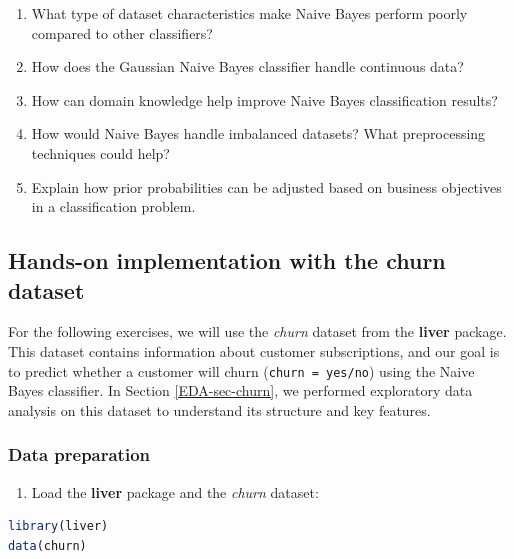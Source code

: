 \documentclass[
]{book}
\newcommand{\passthrough}[1]{#1}
\providecommand{\tightlist}{%
  \setlength{\itemsep}{0pt}\setlength{\parskip}{0pt}}
\theoremstyle{definition}
\theoremstyle{definition}
\theoremstyle{definition}
\theoremstyle{definition}
\theoremstyle{remark}
\begin{document}
\begin{enumerate}
\item
  What type of dataset characteristics make Naive Bayes perform poorly compared to other classifiers?\\
\item
  How does the Gaussian Naive Bayes classifier handle continuous data?\\
\item
  How can domain knowledge help improve Naive Bayes classification results?\\
\item
  How would Naive Bayes handle imbalanced datasets? What preprocessing techniques could help?\\
\item
  Explain how prior probabilities can be adjusted based on business objectives in a classification problem.
\end{enumerate}

\subsection*{Hands-on implementation with the churn dataset}\label{hands-on-implementation-with-the-churn-dataset}

For the following exercises, we will use the \emph{churn} dataset from the \textbf{liver} package. This dataset contains information about customer subscriptions, and our goal is to predict whether a customer will churn (\passthrough{\lstinline!churn = yes/no!}) using the Naive Bayes classifier. In Section \ref{EDA-sec-churn}, we performed exploratory data analysis on this dataset to understand its structure and key features.

\subsubsection*{Data preparation}\label{data-preparation-2}

\begin{enumerate}
\def\labelenumi{\arabic{enumi}.}
\setcounter{enumi}{16}
\tightlist
\item
  Load the \textbf{liver} package and the \emph{churn} dataset:
\end{enumerate}

\begin{lstlisting}[language=R]
library(liver)
data(churn)
\end{lstlisting}
\end{document}
